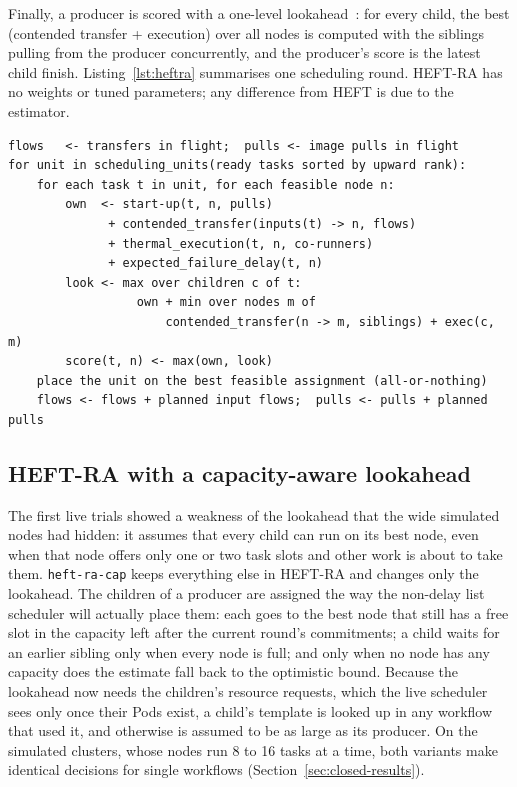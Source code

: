 \documentclass[12pt,a4paper]{report}
\newcommand{\pol}[1]{\texttt{#1}}
\begin{document}
Finally, a producer is scored with a one-level
lookahead~\cite{bittencourt2010lookahead}: for every child, the best
(contended transfer + execution) over all nodes is computed with the
siblings pulling from the producer concurrently, and the producer's score
is the latest child finish. Listing~\ref{lst:heftra} summarises one
scheduling round. HEFT-RA has no weights or tuned parameters; any
difference from HEFT is due to the estimator.

\begin{lstlisting}[caption={One HEFT-RA scheduling round.},label={lst:heftra},language={}]
flows   <- transfers in flight;  pulls <- image pulls in flight
for unit in scheduling_units(ready tasks sorted by upward rank):
    for each task t in unit, for each feasible node n:
        own  <- start-up(t, n, pulls)
              + contended_transfer(inputs(t) -> n, flows)
              + thermal_execution(t, n, co-runners)
              + expected_failure_delay(t, n)
        look <- max over children c of t:
                  own + min over nodes m of
                      contended_transfer(n -> m, siblings) + exec(c, m)
        score(t, n) <- max(own, look)
    place the unit on the best feasible assignment (all-or-nothing)
    flows <- flows + planned input flows;  pulls <- pulls + planned pulls
\end{lstlisting}

\subsection{HEFT-RA with a capacity-aware lookahead}
\label{sec:heftra-cap}

The first live trials showed a weakness of the lookahead that the wide
simulated nodes had hidden: it assumes that every child can run on its
best node, even when that node offers only one or two task slots and other
work is about to take them. \pol{heft-ra-cap} keeps everything else in
HEFT-RA and changes only the lookahead. The children of a producer are
assigned the way the non-delay list scheduler will actually place them:
each goes to the best node that still has a free slot in the capacity left
after the current round's commitments; a child waits for an earlier
sibling only when every node is full; and only when no node has any
capacity does the estimate fall back to the optimistic bound. Because the
lookahead now needs the children's resource requests, which the live
scheduler sees only once their Pods exist, a child's template is looked up
in any workflow that used it, and otherwise is assumed to be as large as
its producer. On the simulated clusters, whose nodes run 8 to 16 tasks at
a time, both variants make identical decisions for single workflows
(Section~\ref{sec:closed-results}).
\end{document}
